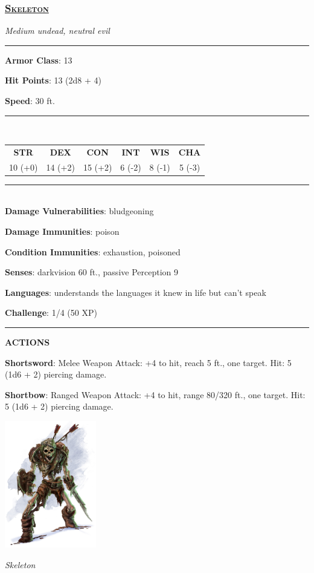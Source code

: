 \subsubsection*{\underline{\textsc{\Large Skeleton}}}
\noindent\emph{Medium undead, neutral evil}

\noindent\rule{0.5\textwidth}{0.5pt}

\noindent\textbf{Armor Class}: 13

\noindent\textbf{Hit Points}: 13 (2d8 + 4)

\noindent\textbf{Speed}: 30 ft.

\noindent\rule{0.5\textwidth}{0.5pt} \\
\begin{table}[H]
	\begin{tabular}{cccccc}
		\textbf{STR} & \textbf{DEX} & \textbf{CON} & \textbf{INT} & \textbf{WIS} & \textbf{CHA} \\
		10 (+0) & 14 (+2) & 15 (+2) & 6 (-2) & 8 (-1) & 5 (-3) \\
	\end{tabular}
\end{table}
\noindent\rule{0.5\textwidth}{0.5pt} \\

\noindent\textbf{Damage Vulnerabilities}: bludgeoning

\noindent\textbf{Damage Immunities}: poison

\noindent\textbf{Condition Immunities}: exhaustion, poisoned

\noindent\textbf{Senses}: darkvision 60 ft., passive Perception 9

\noindent\textbf{Languages}: understands the languages it knew in life but can't speak

\noindent\textbf{Challenge}: 1/4 (50 XP)

\noindent\rule{0.5\textwidth}{0.5pt}

\noindent\textbf{ACTIONS}

\noindent\textbf{Shortsword}: Melee Weapon Attack: +4 to hit, reach 5 ft., one target. Hit: 5 (1d6 + 2) piercing damage.

\noindent\textbf{Shortbow}:  Ranged Weapon Attack: +4 to hit, range 80/320 ft., one target. Hit: 5 (1d6 + 2) piercing damage.

\begin{center}
	\includegraphics[width = 0.3\textwidth]{skeleton}
	
	\emph{Skeleton}
\end{center}
